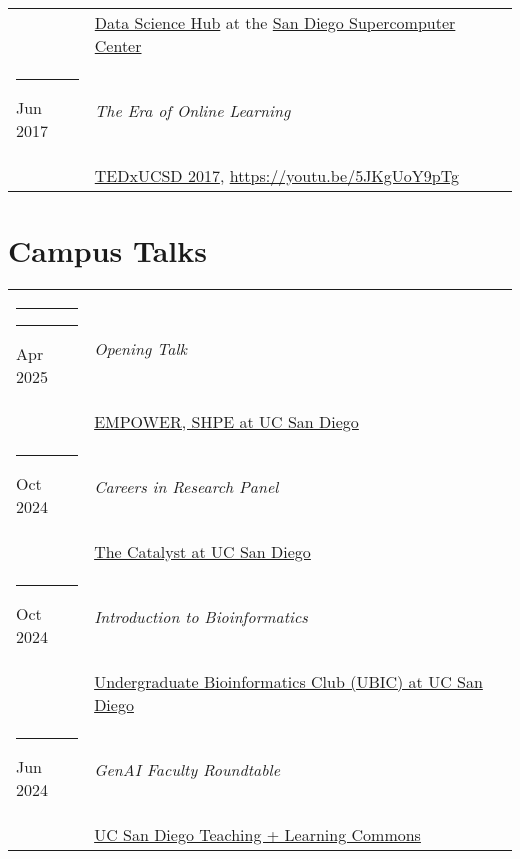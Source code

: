 \documentclass[margin,line]{res}
\begin{document}
\begin{resume}
\begin{longtable}{@{}p{0.7in}p{4in}}
\hspace*{-4mm} & \hspace{4mm} \href{https://datascience.sdsc.edu/}{Data Science Hub} at the \href{https://www.sdsc.edu/}{San Diego Supercomputer Center}\\
\hspace*{-4mm} \rule{-1mm}{5mm} Jun 2017 & \textit{The Era of Online Learning}\\*
\hspace*{-4mm} & \hspace{4mm} \href{https://www.ted.com/tedx/events/22004}{TEDxUCSD 2017}, \href{https://youtu.be/5JKgUoY9pTg}{https://youtu.be/5JKgUoY9pTg}\\
\end{longtable}

\section{\sc Campus Talks}
\begin{longtable}{@{}p{0.7in}p{4in}}\rule{-1mm}{4.5mm}
\hspace*{-4mm} \rule{-1mm}{5mm} Apr 2025 & \textit{Opening Talk}\\*
\hspace*{-4mm} & \hspace{4mm} \href{https://sites.google.com/view/shpeucsd}{EMPOWER, SHPE at UC San Diego}\\
\hspace*{-4mm} \rule{-1mm}{5mm} Oct 2024 & \textit{Careers in Research Panel}\\*
\hspace*{-4mm} & \hspace{4mm} \href{https://escholarship.org/uc/ucsd_aep_catalyst}{The Catalyst at UC San Diego}\\
\hspace*{-4mm} \rule{-1mm}{5mm} Oct 2024 & \textit{Introduction to Bioinformatics}\\*
\hspace*{-4mm} & \hspace{4mm} \href{https://ubicucsd.github.io/}{Undergraduate Bioinformatics Club (UBIC) at UC San Diego}\\
\hspace*{-4mm} \rule{-1mm}{5mm} Jun 2024 & \textit{GenAI Faculty Roundtable}\\*
\hspace*{-4mm} & \hspace{4mm} \href{https://commons.ucsd.edu/}{UC San Diego Teaching + Learning Commons}\\

\end{longtable}
\end{resume}
\end{document}
